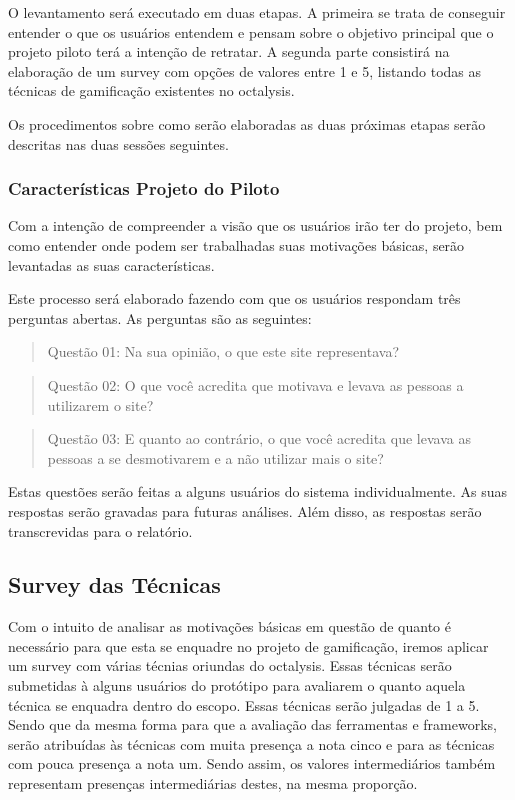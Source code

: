 O levantamento será executado em duas etapas. A primeira se trata de conseguir entender o que os usuários entendem e pensam sobre o objetivo
principal que o projeto piloto terá a intenção de retratar. A segunda parte consistirá na elaboração de um survey com opções de valores entre 1 e 5,
listando todas as técnicas de gamificação existentes no octalysis.

Os procedimentos sobre como serão elaboradas as duas próximas etapas serão descritas nas duas sessões seguintes. 

\subsubsection{Características Projeto do Piloto}
\label{sub:caracter_sticas_projeto_do_piloto}
Com a intenção de compreender a visão que os usuários irão ter do projeto, bem como entender onde podem ser trabalhadas suas motivações básicas,
serão levantadas as suas características.

Este processo será elaborado fazendo com que os usuários respondam três perguntas abertas. As perguntas são as seguintes:

\begin{quotation}
    Questão 01: Na sua opinião, o que este site representava?
\end{quotation}

\begin{quotation}
    Questão 02: O que você acredita que motivava e levava as pessoas a utilizarem o site?
\end{quotation}

\begin{quotation}
    Questão 03: E quanto ao contrário, o que você acredita que levava as pessoas a se desmotivarem e a não
    utilizar mais o site?
\end{quotation}

Estas questões serão feitas a alguns usuários do sistema individualmente. As suas respostas serão gravadas para futuras análises.
Além disso, as respostas serão transcrevidas para o relatório.

\subsection{Survey das Técnicas}
\label{sub:survey_das_t_cnicas}
Com o intuito de analisar as motivações básicas em questão de quanto é necessário para que esta se enquadre no projeto
de gamificação, iremos aplicar um survey com várias técnias oriundas do octalysis. Essas técnicas serão submetidas à alguns
usuários do protótipo para avaliarem o quanto aquela técnica se enquadra dentro do escopo. Essas técnicas serão julgadas de 1
a 5. Sendo que da mesma forma para que a avaliação das ferramentas e frameworks, serão atribuídas às técnicas com
muita presença a nota cinco e para as técnicas com pouca presença a nota um. Sendo assim, os valores intermediários
também representam presenças intermediárias destes, na mesma proporção.

